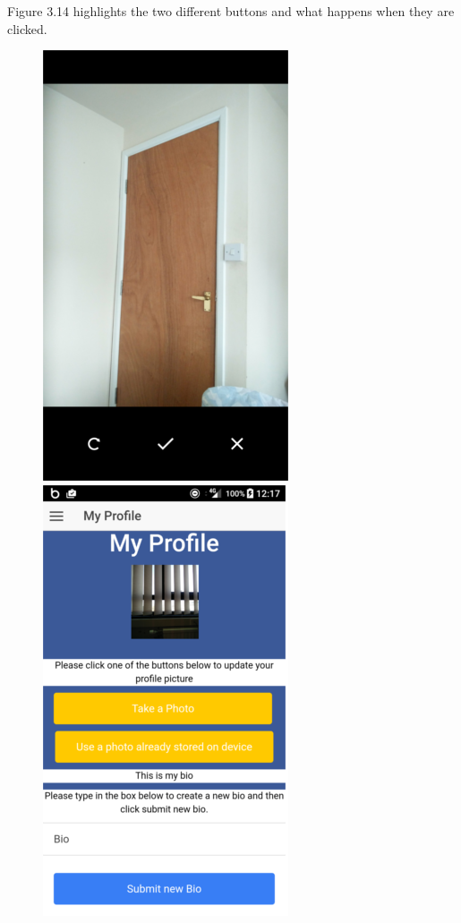Figure 3.14 highlights the two different buttons and what happens when they are clicked.
\begin{center}
\begin{figure}[H]
\includegraphics[scale=0.5]{images/cs}
\includegraphics[scale=0.5]{images/sc7}

\end{figure}
\end{center}
